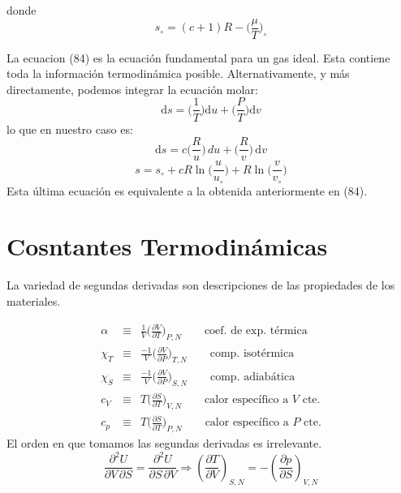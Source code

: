 \documentclass[10pt,twocolumn]{IEEEtran2e}
\newcommand{\ud}{\mathrm{d}}
\begin{document}
donde 
\begin{equation}
 s_{\circ} = (c+1)R - \bigg( \frac{\mu}{T}\bigg)_{\circ}
\end{equation}

La ecuacion (84) es la ecuaci\'on fundamental para un gas ideal. Esta contiene toda la informaci\'on termodin\'amica posible. Alternativamente, y m\'as directamente, podemos integrar la ecuaci\'on molar:
\begin{equation}
 \ud s = \bigg( \frac{1}{T}\bigg)\ud u + \bigg(\frac{P}{T}\bigg)\ud v
\end{equation}
lo que en nuestro caso es:
\begin{equation}
 \ud s = c \bigg(\frac{R}{u}\bigg)\, du + \bigg(\frac{R}{v}\bigg)\,\ud v
\end{equation}
\begin{equation}
 s=s_{\circ}+cR\ln\bigg(\frac{u}{u_{\circ}}\bigg) + R \ln\bigg(\frac{v}{v_{\circ}}\bigg)
\end{equation}
Esta \'ultima ecuaci\'on es equivalente a la obtenida anteriormente en (84).

\section{Cosntantes Termodin\'amicas}
La variedad de segundas derivadas son descripciones de las propiedades de los materiales. 

\begin{eqnarray}
\alpha &\equiv & \frac{1}{V} \bigg(\frac{\partial V}{\partial T}\bigg)_{P,N}\qquad \textrm{coef. de exp. t\'ermica}\\
\chi_{T} &\equiv & \frac{-1}{V} \bigg(\frac{\partial V}{\partial P}\bigg)_{T,N}\qquad \textrm{comp. isot\'ermica}\\
\chi_{S} &\equiv & \frac{-1}{V} \bigg(\frac{\partial V}{\partial P}\bigg)_{S,N}\qquad \textrm{comp. adiab\'atica}\\
c_{V} &\equiv & T \bigg(\frac{\partial S}{\partial T}\bigg)_{V,N}\qquad \textrm{calor espec\'ifico a $V$ cte.}\\
c_{p} &\equiv & T \bigg(\frac{\partial S}{\partial T}\bigg)_{P,N}\qquad \textrm{calor espec\'ifico a $P$ cte.}
\end{eqnarray}
El orden en que tomamos las segundas derivadas es irrelevante.
\begin{equation}
 \frac{\partial^{2} U}{\partial V \, \partial S} = \frac{\partial^{2} U}{\partial S \, \partial V} \Longrightarrow \left(\frac{\partial T}{\partial V}\right)_{S,N} = - \left(\frac{\partial p}{\partial S}\right)_{V,N}
\end{equation}
\end{document}
